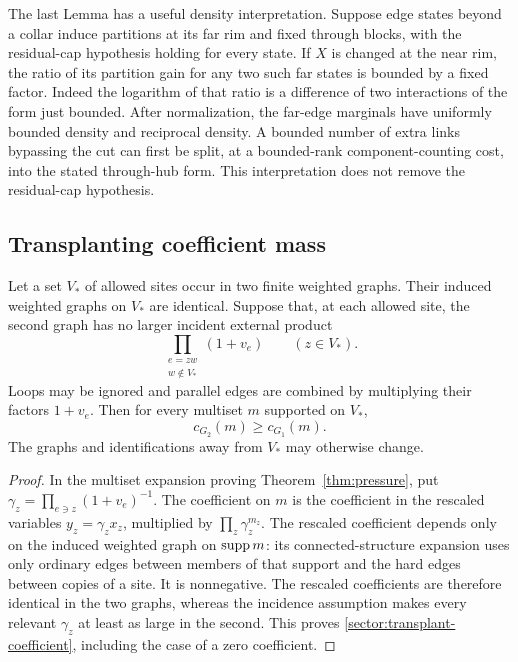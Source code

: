 The last Lemma has a useful density interpretation.  Suppose edge
states beyond a collar induce partitions at its far rim and fixed
through blocks, with the residual-cap hypothesis holding for every
state.  If $X$ is changed at the near rim, the ratio of its partition
gain for any two such far states is bounded by a fixed factor.  Indeed
the logarithm of that ratio is a difference of two interactions of
the form just bounded.  After normalization, the far-edge marginals
have uniformly bounded density and reciprocal density.  A bounded
number of extra links bypassing the cut can first be split, at a
bounded-rank component-counting cost, into the stated through-hub
form.  This interpretation does not remove the residual-cap
hypothesis.

\subsection{Transplanting coefficient mass}
\label{sector:transplant-subsection}

\begin{lemma}
\label{lem:transplant}
Let a set $V_*$ of allowed sites occur in two finite weighted graphs.
Their induced weighted graphs on $V_*$ are identical.  Suppose that,
at each allowed site, the second graph has no larger incident
external product
\[
 \prod_{\substack{e=zw\\w\notin V_*}}(1+v_e)
 \qquad(z\in V_*).
\]
Loops may be ignored and parallel edges are combined by multiplying
their factors $1+v_e$.  Then for every multiset $m$ supported on
$V_*$,
\begin{equation}
 c_{G_2}(m)\ge c_{G_1}(m).
 \label{sector:transplant-coefficient}
\end{equation}
The graphs and identifications away from $V_*$ may otherwise change.
\end{lemma}

\begin{proof}
In the multiset expansion proving Theorem~\ref{thm:pressure}, put
$\gamma_z=\prod_{e\ni z}(1+v_e)^{-1}$.  The coefficient on $m$ is
the coefficient in the rescaled variables $y_z=\gamma_zx_z$,
multiplied by $\prod_z\gamma_z^{m_z}$.  The rescaled coefficient
depends only on the induced weighted graph on $\operatorname{supp} m$: its
connected-structure expansion uses only ordinary edges between
members of that support and the hard edges between copies of a site.
It is nonnegative.  The rescaled coefficients are therefore identical
in the two graphs, whereas the incidence assumption makes every
relevant $\gamma_z$ at least as large in the second.  This proves
\eqref{sector:transplant-coefficient}, including the case of a zero
coefficient.
\end{proof}


